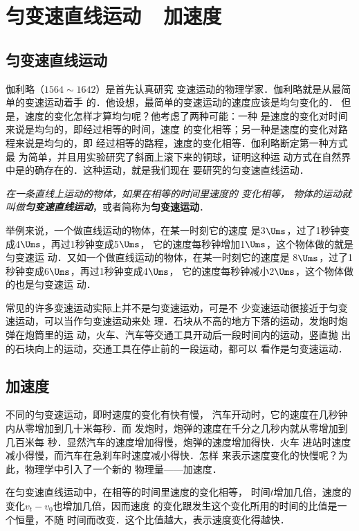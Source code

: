 \section{匀变速直线运动~~加速度}
    \subsection{匀变速直线运动}
    
    伽利略（$1564 \sim 1642$）是首先认真研究
变速运动的物理学家．伽利略就是从最简单的变速运动着手
的．他设想，最简单的变速运动的速度应该是均匀变化的．
但是，速度的变化怎样才算均匀呢？他考虑了两种可能：一种
是速度的变化对时间来说是均匀的，即经过相等的时间，速度
的变化相等；另一种是速度的变化对路程来说是均匀的，即
经过相等的路程，速度的变化相等．伽利略断定第一种方式最
为简单，并且用实验研究了斜面上滚下来的铜球，证明这种运
动方式在自然界中是的确存在的．这种运动，就是我们现在
要研究的匀变速直线运动．

\textit{在一条直线上运动的物体，如果在相等的时间里速度的
变化相等，
物体的运动就叫做\textbf{匀变速直线运动}}，或者简称为\textbf{匀变速运动}．

举例来说，一个做直线运动的物体，在某一时刻它的速度
是3$\Ums$，过了1秒钟变成4$\Ums$，再过1秒钟变成5$\Ums$，
它的速度每秒钟增加1$\Ums$，这个物体做的就是匀变速运
动．又如一个做直线运动的物体，在某一时刻它的速度是
8$\Ums$，过了1秒钟变成6$\Ums$，再过1秒钟变成4$\Ums$，
它的速度每秒钟减小2$\Ums$，这个物体做的也是匀变速运
动．

    常见的许多变速运动实际上并不是匀变速运劝，可是不
少变速运动很接近于匀变速运动，可以当作匀变速运动来处
理．石块从不高的地方下落的运动，发炮时炮弹在炮筒里的运
动，火车、汽车等交通工具开动后一段时间内的运动，竖直抛
出的石块向上的运动，交通工具在停止前的一段运动，都可以
看作是匀变速运动．

\subsection{加速度}
不同的匀变速运动，即时速度的变化有快有慢，
汽车开动时，它的速度在几秒钟内从零增加到几十米每秒．而
发炮时，炮弹的速度在千分之几秒内就从零增加到几百米每
秒．显然汽车的速度增加得慢，炮弹的速度增加得快．火车
进站时速度减小得慢，而汽车在急刹车时速度减小得快．怎样
来表示速度变化的快慢呢？为此，物理学中引入了一个新的
物理量——加速度．

在匀变速直线运动中，在相等的时间里速度的变化相等，
时间$t$增加几倍，速度的变化$v_t-v_0$也增加几倍，因而速度
的变化跟发生这个变化所用的时间的比值是一个恒量，不随
时间而改变．这个比值越大，表示速度变化得越快．

